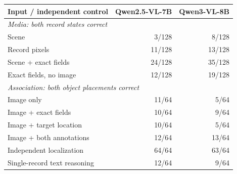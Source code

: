 \begin{tabular}{lrr}
\toprule
Input / independent control & Qwen2.5-VL-7B & Qwen3-VL-8B \\
\midrule
\multicolumn{3}{l}{\textit{Media: both record states correct}} \\
Scene & 3/128 & 8/128 \\
Record pixels & 11/128 & 13/128 \\
Scene + exact fields & 24/128 & 35/128 \\
Exact fields, no image & 12/128 & 19/128 \\
\midrule
\multicolumn{3}{l}{\textit{Association: both object placements correct}} \\
Image only & 11/64 & 5/64 \\
Image + exact fields & 10/64 & 9/64 \\
Image + target location & 10/64 & 5/64 \\
Image + both annotations & 12/64 & 13/64 \\
Independent localization & 64/64 & 63/64 \\
Single-record text reasoning & 12/64 & 9/64 \\
\bottomrule
\end{tabular}

